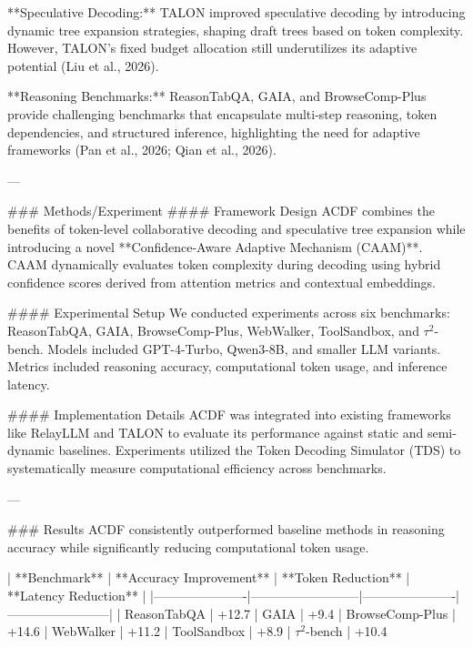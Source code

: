 **Speculative Decoding:** TALON improved speculative decoding by introducing dynamic tree expansion strategies, shaping draft trees based on token complexity. However, TALON’s fixed budget allocation still underutilizes its adaptive potential (Liu et al., 2026).  

**Reasoning Benchmarks:** ReasonTabQA, GAIA, and BrowseComp-Plus provide challenging benchmarks that encapsulate multi-step reasoning, token dependencies, and structured inference, highlighting the need for adaptive frameworks (Pan et al., 2026; Qian et al., 2026).  

---

### Methods/Experiment  
#### Framework Design  
ACDF combines the benefits of token-level collaborative decoding and speculative tree expansion while introducing a novel **Confidence-Aware Adaptive Mechanism (CAAM)**. CAAM dynamically evaluates token complexity during decoding using hybrid confidence scores derived from attention metrics and contextual embeddings.  

#### Experimental Setup  
We conducted experiments across six benchmarks: ReasonTabQA, GAIA, BrowseComp-Plus, WebWalker, ToolSandbox, and $τ^2$-bench. Models included GPT-4-Turbo, Qwen3-8B, and smaller LLM variants. Metrics included reasoning accuracy, computational token usage, and inference latency.  

#### Implementation Details  
ACDF was integrated into existing frameworks like RelayLLM and TALON to evaluate its performance against static and semi-dynamic baselines. Experiments utilized the Token Decoding Simulator (TDS) to systematically measure computational efficiency across benchmarks.  

---

### Results  
ACDF consistently outperformed baseline methods in reasoning accuracy while significantly reducing computational token usage.  

| **Benchmark**       | **Accuracy Improvement** | **Token Reduction** | **Latency Reduction** |  
|----------------------|--------------------------|----------------------|------------------------|  
| ReasonTabQA          | +12.7%
| GAIA                 | +9.4%
| BrowseComp-Plus      | +14.6%
| WebWalker            | +11.2%
| ToolSandbox          | +8.9%
| $τ^2$-bench          | +10.4%

